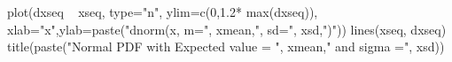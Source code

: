 \begin{Schunk}
\begin{Sinput}
  plot(dxseq ~ xseq, type="n", ylim=c(0,1.2* max(dxseq)), xlab="x",ylab=paste("dnorm(x, m=", xmean,", sd=", xsd,")"))
  lines(xseq, dxseq)
  title(paste("Normal PDF with Expected value = ", xmean," and sigma =", xsd))
\end{Sinput}
\end{Schunk}
